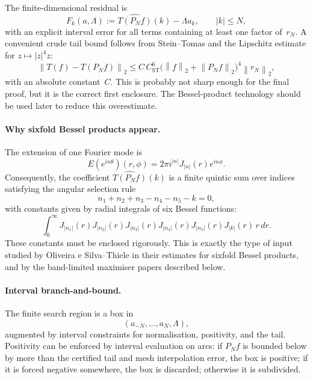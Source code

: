 \documentclass[12pt]{article}
\theoremstyle{definition}
\theoremstyle{remark}
\newcommand{\norm}[1]{\left\|#1\right\|}
\begin{document}
The finite-dimensional residual is
\[
  F_k(a,\Lambda)
  :=
  \widehat{T(P_Nf)}(k)-\Lambda a_k,
  \qquad |k|\leq N,
\]
with an explicit interval error for all terms containing at least one
factor of~$r_N$.  A convenient crude tail bound follows from
Stein--Tomas and the Lipschitz estimate for $z\mapsto |z|^4z$:
\[
  \norm{T(f)-T(P_Nf)}_2
  \leq
  C\,C_{\mathrm{ST}}^6
  \bigl(\norm{f}_2+\norm{P_Nf}_2\bigr)^4
  \norm{r_N}_2,
\]
with an absolute constant~$C$.  This is probably not sharp enough for the
final proof, but it is the correct first enclosure.  The Bessel-product
technology should be used later to reduce this overestimate.

\paragraph{Why sixfold Bessel products appear.}
The extension of one Fourier mode is
\[
  E(e^{in\theta})(r,\phi)
  =2\pi i^{|n|}J_{|n|}(r)e^{in\phi}.
\]
Consequently, the coefficient $\widehat{T(P_Nf)}(k)$ is a finite quintic
sum over indices satisfying the angular selection rule
\[
  n_1+n_2+n_3-n_4-n_5-k=0,
\]
with constants given by radial integrals of six Bessel functions:
\[
  \int_0^\infty
  J_{|n_1|}(r)J_{|n_2|}(r)J_{|n_3|}(r)
  J_{|n_4|}(r)J_{|n_5|}(r)J_{|k|}(r)\,r\,dr.
\]
These constants must be enclosed rigorously.  This is exactly the type of
input studied by Oliveira e Silva--Thiele in their estimates for sixfold
Bessel products, and by the band-limited maximiser papers described below.

\paragraph{Interval branch-and-bound.}
The finite search region is a box in
\[
  (a_{-N},\ldots,a_N,\Lambda),
\]
augmented by interval constraints for normalisation, positivity, and the
tail.  Positivity can be enforced by interval evaluation on arcs: if
$P_Nf$ is bounded below by more than the certified tail and mesh
interpolation error, the box is positive; if it is forced negative
somewhere, the box is discarded; otherwise it is subdivided.
\end{document}
